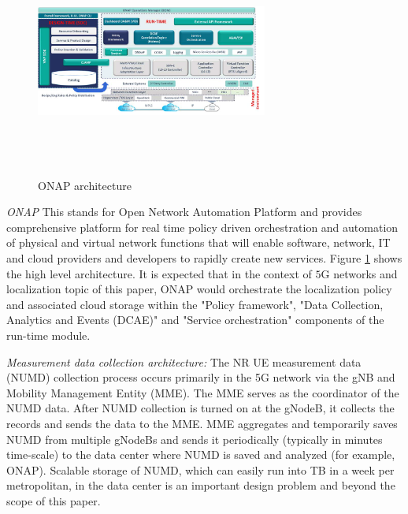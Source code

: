 \documentclass[conference, 10pt]{IEEEtran}
\begin{document}

\begin{figure}[t]
\begin{center}
\includegraphics[height=3.0in,width=3.0in]{./ONAP-architecture.png}
\caption{\label{fig:onap_arch}
{\small ONAP architecture}}
\end{center}
\end{figure}



{\em ONAP} This stands for Open Network Automation Platform and provides comprehensive platform for real time policy driven orchestration and automation of physical and virtual network functions that will enable software, network,
IT and cloud providers and developers to rapidly create new services. Figure \ref{fig:onap_arch} shows the high level architecture. It is expected that in the context of $5$G networks and localization topic of this paper, ONAP would orchestrate the localization policy and associated cloud storage within the "Policy framework", "Data Collection, Analytics and Events (DCAE)" and "Service orchestration" components of the run-time module. 

{\em Measurement data collection architecture:} The NR UE measurement data (NUMD) collection process occurs primarily in the 5G network via the gNB and Mobility Management Entity (MME). The MME serves as the coordinator of the NUMD data.
After NUMD collection is turned on at the gNodeB, it collects the records and sends
the data to the MME. MME aggregates and temporarily saves NUMD from multiple
gNodeBs and sends it periodically (typically in minutes time-scale) to the data
center  where NUMD is saved and analyzed (for example, ONAP). Scalable storage of NUMD, which can easily
run into TB in a week per metropolitan, in the data center is an important design
problem and beyond the scope of this paper.
\end{document}
